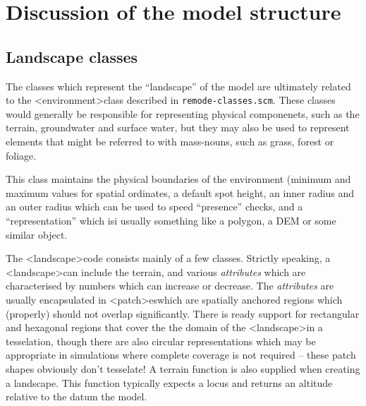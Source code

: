 \documentclass[a4]{article}
\newcommand{\filename}[1]{\texttt{#1}}
\newcommand{\rclass}[1]{\textsf{<#1>}}
\newcommand{\landscape}[0]{\rclass{landscape}}
\newcommand{\environment}[0]{\rclass{environment}}
\newcommand{\patch}[0]{\rclass{patch}}
\newcommand{\patches}[0]{{\patch}es}
\begin{document}
\title[Remodel]{}



\section{Discussion of the model structure}

\subsection{Landscape classes}
The classes which represent the ``landscape'' of the model are
ultimately related to the \environment class described in
\filename{remode-classes.scm}. These classes would generally be
responsible for representing physical componenets, such as the
terrain, groundwater and surface water, but they may also be used to
represent elements that might be referred to with mass-nouns, such as
grass, forest or foliage.  

This class maintains the physical boundaries of the environment
(minimum and maximum values for spatial ordinates, a default spot
height, an inner radius and an outer radius which can be used to speed
``presence'' checks, and a ``representation'' which isi usually
something like a polygon, a DEM or some similar object.

The \landscape code consists mainly of a few classes.  Strictly
speaking, a \landscape can include the terrain, and various
\textit{attributes} which are characterised by numbers which can
increase or decrease. The \textit{attributes} are usually encapsulated
in \patches which are spatially anchored regions which (properly)
should not overlap significantly.  There is ready support for
rectangular and hexagonal regions that cover the the domain of the
\landscape in a tesselation, though there are also circular
representations which may be appropriate in simulations where complete
coverage is not required -- these patch shapes obviously don't
tesselate!  A terrain function is also supplied when creating a
landscape. This function typically expects a locus and returns an
altitude relative to the datum  the model.
\end{document}
